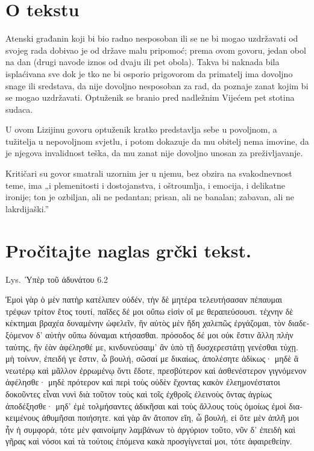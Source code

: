 


\section*{O tekstu}

Atenski građanin koji bi bio radno nesposoban ili se ne bi mogao uzdržavati od svojeg rada dobivao je od države malu pripomoć; prema ovom govoru, jedan obol na dan (drugi navode iznos od dvaju ili pet obola). Takva bi naknada bila isplaćivana sve dok je tko ne bi osporio prigovorom da primatelj ima dovoljno snage ili sredstava, da nije dovoljno nesposoban za rad, da poznaje zanat kojim bi se mogao uzdržavati. Optuženik se branio pred nadležnim Vijećem pet stotina sudaca.

U ovom Lizijinu govoru optuženik kratko predstavlja sebe u povoljnom, a tužitelja u nepovoljnom svjetlu, i potom dokazuje da mu obitelj nema imovine, da je njegova invalidnost teška, da mu zanat nije dovoljno unosan za preživljavanje.

Kritičari su govor smatrali uzornim jer u njemu, bez obzira na svakodnevnost teme, ima „i plemenitosti i dostojanstva, i oštroumlja, i emocija, i delikatne ironije; ton je ozbiljan, ali ne pedantan; prisan, ali ne banalan; zabavan, ali ne lakrdijaški.''


\section*{Pročitajte naglas grčki tekst.}

Lys.\ Ὑπὲρ τοῦ ἀδυνάτου 6.2

\medskip

{\large
\begin{greek}
\noindent Ἐμοὶ γὰρ ὁ μὲν πατὴρ κατέλιπεν οὐδέν, τὴν δὲ μητέρα τελευτήσασαν πέπαυμαι τρέφων τρίτον ἔτος τουτί, παῖδες δέ μοι οὔπω εἰσὶν οἵ με θεραπεύσουσι. τέχνην δὲ κέκτημαι βραχέα δυναμένην ὠφελεῖν, ἣν αὐτὸς μὲν ἤδη χαλεπῶς ἐργάζομαι, τὸν διαδεξόμενον δ' αὐτὴν οὔπω δύναμαι κτήσασθαι. πρόσοδος δέ μοι οὐκ ἔστιν ἄλλη πλὴν ταύτης, ἣν ἐὰν ἀφέλησθέ με, κινδυνεύσαιμ' ἂν ὑπὸ τῇ δυσχερεστάτῃ γενέσθαι τύχῃ. μὴ τοίνυν, ἐπειδή γε ἔστιν, ὦ βουλή, σῶσαί με δικαίως, ἀπολέσητε ἀδίκως· μηδὲ ἃ νεωτέρῳ καὶ μᾶλλον ἐρρωμένῳ ὄντι ἔδοτε, πρεσβύτερον καὶ ἀσθενέστερον γιγνόμενον ἀφέλησθε· μηδὲ πρότερον καὶ περὶ τοὺς οὐδὲν ἔχοντας κακὸν ἐλεημονέστατοι δοκοῦντες εἶναι νυνὶ διὰ τοῦτον τοὺς καὶ τοῖς ἐχθροῖς ἐλεινοὺς ὄντας ἀγρίως ἀποδέξησθε· μηδ' ἐμὲ τολμήσαντες ἀδικῆσαι καὶ τοὺς ἄλλους τοὺς ὁμοίως ἐμοὶ διακειμένους ἀθυμῆσαι ποιήσητε. καὶ γὰρ ἂν ἄτοπον εἴη, ὦ βουλή, εἰ ὅτε μὲν ἁπλῆ μοι ἦν ἡ συμφορά, τότε μὲν φαινοίμην λαμβάνων τὸ ἀργύριον τοῦτο, νῦν δ' ἐπειδὴ καὶ γῆρας καὶ νόσοι καὶ τὰ τούτοις ἑπόμενα κακὰ προσγίγνεταί μοι, τότε ἀφαιρεθείην.

\end{greek}
}

